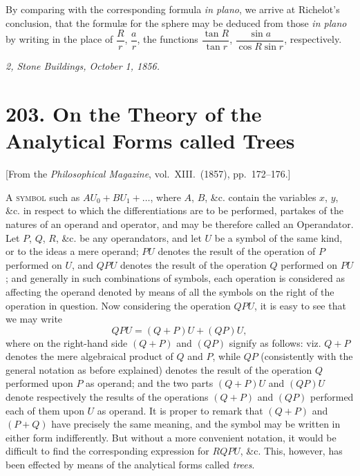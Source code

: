 \documentclass[11pt,a4paper]{book}
\begin{document}
\medskip


\medskip

By comparing with the corresponding formula \textit{in plano}, we arrive at Richelot's
conclusion, that the formul\ae{} for the sphere may be deduced from those \textit{in plano} by
writing in the place of $\dfrac{R}{r}$, $\dfrac{a}{r}$, the functions $\dfrac{\tan R}{\tan r}$, $\dfrac{\sin a}{\cos R \sin r}$, respectively.

\bigskip

\noindent\textit{2, Stone Buildings, October 1, 1856.}

\newpage


\section*{203. On the Theory of the Analytical Forms called Trees}

\begin{center}
[From the \textit{Philosophical Magazine}, vol.~XIII.~(1857), pp.~172--176.]
\end{center}

\bigskip

A \textsc{symbol} such as $AU_0 + BU_1 + \ldots$, where $A$, $B$, \&c. contain the variables $x$, $y$, \&c. in
respect to which the differentiations are to be performed, partakes of the natures
of an operand and operator, and may be therefore called an Operandator. Let
$P$, $Q$, $R$, \&c. be any operandators, and let $U$ be a symbol of the same kind, or to
the ideas a mere operand; $PU$ denotes the result of the operation of $P$ performed on
$U$, and $QPU$ denotes the result of the operation $Q$ performed on $PU$; and generally
in such combinations of symbols, each operation is considered as affecting the operand
denoted by means of all the symbols on the right of the operation in question. Now
considering the operation $QPU$, it is easy to see that we may write
\[
QPU = (Q + P)U + (QP)U,
\]
where on the right-hand side $(Q + P)$ and $(QP)$ signify as follows: viz. $Q + P$ denotes
the mere algebraical product of $Q$ and $P$, while $QP$ (consistently with the general
notation as before explained) denotes the result of the operation $Q$ performed upon
$P$ as operand; and the two parts $(Q + P)U$ and $(QP)U$ denote respectively the
results of the operations $(Q + P)$ and $(QP)$ performed each of them upon $U$ as operand.
It is proper to remark that $(Q + P)$ and $(P + Q)$ have precisely the same meaning,
and the symbol may be written in either form indifferently. But without a more
convenient notation, it would be difficult to find the corresponding expression for
$RQPU$, \&c. This, however, has been effected by means of the analytical forms
called \textit{trees}.
\end{document}
